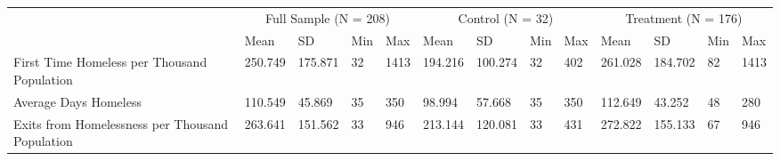 \begin{tabular}{lllllllllllll}
\toprule
 & \multicolumn{4}{c}{Full Sample (N = 208)} & \multicolumn{4}{c}{Control (N = 32)} & \multicolumn{4}{c}{Treatment (N = 176)} \\
 & Mean & SD & Min & Max & Mean & SD & Min & Max & Mean & SD & Min & Max \\
\midrule
First Time Homeless per Thousand Population & 250.749 & 175.871 & 32 & 1413 & 194.216 & 100.274 & 32 & 402 & 261.028 & 184.702 & 82 & 1413 \\
Average Days Homeless & 110.549 & 45.869 & 35 & 350 & 98.994 & 57.668 & 35 & 350 & 112.649 & 43.252 & 48 & 280 \\
Exits from Homelessness per Thousand Population & 263.641 & 151.562 & 33 & 946 & 213.144 & 120.081 & 33 & 431 & 272.822 & 155.133 & 67 & 946 \\
\bottomrule
\end{tabular}
